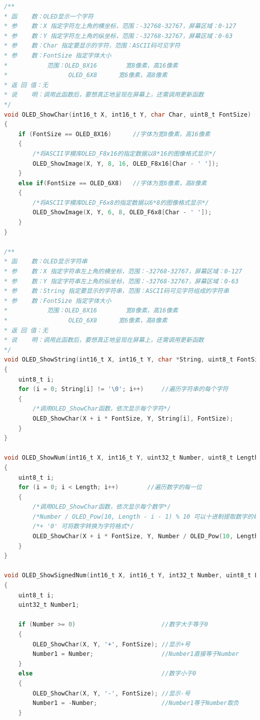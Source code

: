 \documentclass[UTF8]{ctexart}
\begin{document}
\begin{appendices}
\begin{lstlisting}[language=C, caption=OLED.c]
/**
* 函    数：OLED显示一个字符
* 参    数：X 指定字符左上角的横坐标，范围：-32768-32767，屏幕区域：0-127
* 参    数：Y 指定字符左上角的纵坐标，范围：-32768-32767，屏幕区域：0-63
* 参    数：Char 指定要显示的字符，范围：ASCII码可见字符
* 参    数：FontSize 指定字体大小
*           范围：OLED_8X16		宽8像素，高16像素
*                 OLED_6X8		宽6像素，高8像素
* 返 回 值：无
* 说    明：调用此函数后，要想真正地呈现在屏幕上，还需调用更新函数
*/
void OLED_ShowChar(int16_t X, int16_t Y, char Char, uint8_t FontSize)
{
	if (FontSize == OLED_8X16)		//字体为宽8像素，高16像素
	{
		/*将ASCII字模库OLED_F8x16的指定数据以8*16的图像格式显示*/
		OLED_ShowImage(X, Y, 8, 16, OLED_F8x16[Char - ' ']);
	}
	else if(FontSize == OLED_6X8)	//字体为宽6像素，高8像素
	{
		/*将ASCII字模库OLED_F6x8的指定数据以6*8的图像格式显示*/
		OLED_ShowImage(X, Y, 6, 8, OLED_F6x8[Char - ' ']);
	}
}

/**
* 函    数：OLED显示字符串
* 参    数：X 指定字符串左上角的横坐标，范围：-32768-32767，屏幕区域：0-127
* 参    数：Y 指定字符串左上角的纵坐标，范围：-32768-32767，屏幕区域：0-63
* 参    数：String 指定要显示的字符串，范围：ASCII码可见字符组成的字符串
* 参    数：FontSize 指定字体大小
*           范围：OLED_8X16		宽8像素，高16像素
*                 OLED_6X8		宽6像素，高8像素
* 返 回 值：无
* 说    明：调用此函数后，要想真正地呈现在屏幕上，还需调用更新函数
*/
void OLED_ShowString(int16_t X, int16_t Y, char *String, uint8_t FontSize)
{
	uint8_t i;
	for (i = 0; String[i] != '\0'; i++)		//遍历字符串的每个字符
	{
		/*调用OLED_ShowChar函数，依次显示每个字符*/
		OLED_ShowChar(X + i * FontSize, Y, String[i], FontSize);
	}
}

void OLED_ShowNum(int16_t X, int16_t Y, uint32_t Number, uint8_t Length, uint8_t FontSize)
{
	uint8_t i;
	for (i = 0; i < Length; i++)		//遍历数字的每一位							
	{
		/*调用OLED_ShowChar函数，依次显示每个数字*/
		/*Number / OLED_Pow(10, Length - i - 1) % 10 可以十进制提取数字的每一位*/
		/*+ '0' 可将数字转换为字符格式*/
		OLED_ShowChar(X + i * FontSize, Y, Number / OLED_Pow(10, Length - i - 1) % 10 + '0', FontSize);
	}
}

void OLED_ShowSignedNum(int16_t X, int16_t Y, int32_t Number, uint8_t Length, uint8_t FontSize)
{
	uint8_t i;
	uint32_t Number1;
	
	if (Number >= 0)						//数字大于等于0
	{
		OLED_ShowChar(X, Y, '+', FontSize);	//显示+号
		Number1 = Number;					//Number1直接等于Number
	}
	else									//数字小于0
	{
		OLED_ShowChar(X, Y, '-', FontSize);	//显示-号
		Number1 = -Number;					//Number1等于Number取负
	}
	

\end{lstlisting}
\end{appendices}
\end{document}

